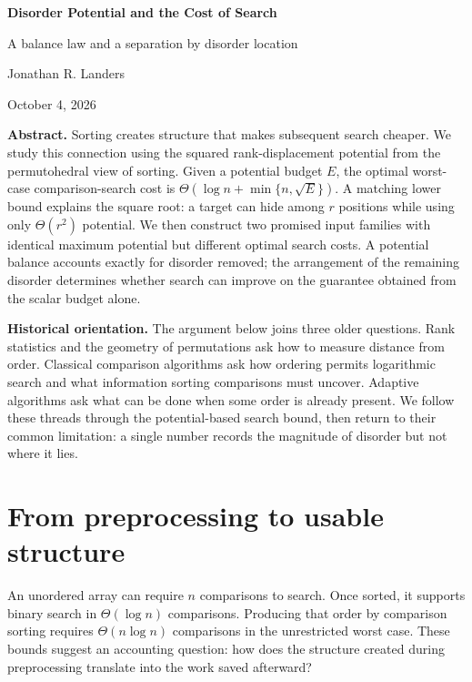 \documentclass[10pt,letterpaper]{article}
\begin{document}
\thispagestyle{plain}
\begin{center}
{\LARGE\bfseries Disorder Potential and the Cost of Search}\par
\vspace{4pt}
{\large A balance law and a separation by disorder location}\par
\vspace{6pt}
Jonathan R. Landers\par
\small October 4, 2026
\end{center}
\vspace{-3pt}
\textbf{Abstract.} Sorting creates structure that makes subsequent search cheaper. We study
this connection using the squared rank-displacement potential from the permutohedral
view of sorting. Given a potential budget $E$, the optimal worst-case comparison-search
cost is $\Theta(\log n+\min\{n,\sqrt E\})$. A matching lower bound explains the square root:
a target can hide among $r$ positions while using only $\Theta(r^2)$ potential. We then
construct two promised input families with identical maximum potential but different
optimal search costs. A potential balance accounts exactly for disorder removed;
the arrangement of the remaining disorder determines whether search can improve on
the guarantee obtained from the scalar budget alone.

\textbf{Historical orientation.} The argument below joins three older questions. Rank
statistics and the geometry of permutations ask how to measure distance from order.
Classical comparison algorithms ask how ordering permits logarithmic search and what
information sorting comparisons must uncover. Adaptive algorithms ask what can be
done when some order is already present. We follow these threads through the
potential-based search bound, then return to their common limitation: a single
number records the magnitude of disorder but not where it lies.

\section{From preprocessing to usable structure}
An unordered array can require $n$ comparisons to search. Once sorted, it supports
binary search in $\Theta(\log n)$ comparisons. Producing that order by comparison sorting
requires $\Theta(n\log n)$ comparisons in the unrestricted worst case. These bounds suggest
an accounting question: how does the structure created during preprocessing translate
into the work saved afterward?
\end{document}
